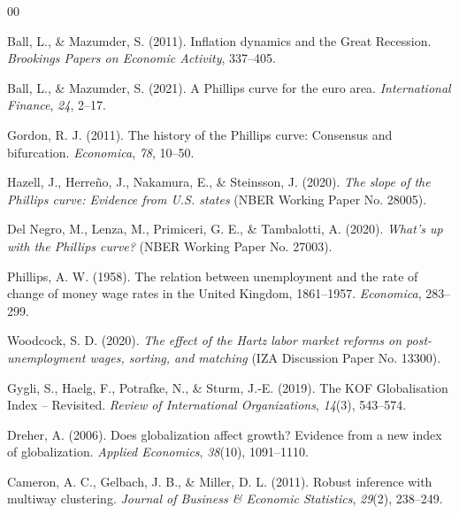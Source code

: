\documentclass[preprint,10pt,authoryear]{elsarticle}
\begin{document}
\begin{thebibliography}{00}


Ball, L., \& Mazumder, S. (2011). Inflation dynamics and the Great Recession. \textit{Brookings Papers on Economic Activity}, 337--405.

Ball, L., \& Mazumder, S. (2021). A Phillips curve for the euro area. \textit{International Finance}, \textit{24}, 2--17. 

Gordon, R. J. (2011). The history of the Phillips curve: Consensus and bifurcation. \textit{Economica}, \textit{78}, 10--50. 

Hazell, J., Herreño, J., Nakamura, E., \& Steinsson, J. (2020). \textit{The slope of the Phillips curve: Evidence from U.S. states} (NBER Working Paper No. 28005). 

Del Negro, M., Lenza, M., Primiceri, G. E., \& Tambalotti, A. (2020). \textit{What's up with the Phillips curve?} (NBER Working Paper No. 27003). 

Phillips, A. W. (1958). The relation between unemployment and the rate of change of money wage rates in the United Kingdom, 1861--1957. \textit{Economica}, 283--299.

Woodcock, S. D. (2020). \textit{The effect of the Hartz labor market reforms on post-unemployment wages, sorting, and matching} (IZA Discussion Paper No. 13300).

Gygli, S., Haelg, F., Potrafke, N., \& Sturm, J.-E. (2019). The KOF Globalisation Index -- Revisited. \textit{Review of International Organizations}, \textit{14}(3), 543--574. 

Dreher, A. (2006). Does globalization affect growth? Evidence from a new index of globalization. \textit{Applied Economics}, \textit{38}(10), 1091--1110.

Cameron, A. C., Gelbach, J. B., \& Miller, D. L. (2011). Robust inference with multiway clustering. \textit{Journal of Business \& Economic Statistics}, \textit{29}(2), 238--249.


\end{thebibliography}
\end{document}
